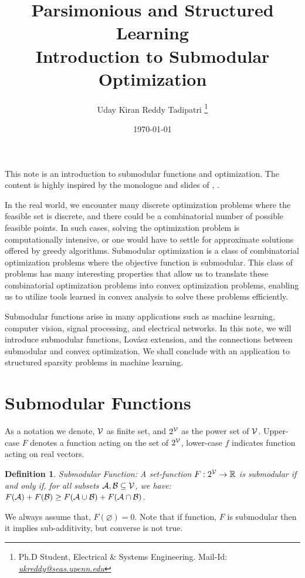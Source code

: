 \documentclass[11pt]{article}
\newtheorem{definition}{Definition}{\bf}{\it}
\begin{document}
\title{Parsimonious and Structured Learning\\
Introduction to Submodular Optimization}

\author{Uday Kiran Reddy Tadipatri
\thanks{Ph.D Student, Electrical \& Systems Engineering. 
Mail-Id: \href{mailto:ukreddy@seas.upenn.edu}{\textit{ukreddy@seas.upenn.edu}}}}

\date{\today}
\maketitle
This note is an introduction to submodular functions and optimization. The content is highly
inspired by the monologue and slides of
\cite{bach_learning_2013a}, \cite{jan-website-24}.

In the real world, we encounter many discrete optimization problems where the feasible set is discrete,
and there could be a combinatorial number of possible feasible points. In such cases, solving the optimization
problem is computationally intensive, or one would have to settle for approximate solutions offered by 
greedy algorithms. Submodular optimization is a class of combinatorial optimization problems where the objective 
function is submodular. This class of problems has many interesting properties that allow us to translate these 
combinatorial optimization problems into convex optimization problems, enabling us to utilize tools learned in 
convex analysis to solve these problems efficiently.


Submodular functions arise in many applications such as machine learning, computer vision, 
signal processing, and electrical networks. In this note, we will introduce submodular functions, 
Lovász extension, and the connections between submodular and convex optimization. We shall conclude with 
an application to structured sparsity problems in machine learning.

\section{Submodular Functions}
As a notation we denote, ${\cal V}$ as finite set, and $2^{{\cal V}}$ as the power set of ${\cal V}$. Upper-case $F$ denotes
a function acting on the set of $2^{{\cal V}}$, lower-case $f$ indicates function acting on real vectors. 
\begin{definition}{Submodular Function:}
A set-function $F: 2^{{\cal V}} \to {\mathbb R}$ is submodular if and only if,
for all subsets ${\cal A}, {\cal B} \subseteq {\cal V}$, we have: $F({\cal A}) + F({\cal B}) \geq F({\cal A} \cup {\cal B}) + F({\cal A} \cap {\cal B})$.
\end{definition}
We always assume that, $F(\varnothing) = 0$. Note that if function, $F$ is submodular
then it implies sub-additivity, but converse is not true.
\end{document}

